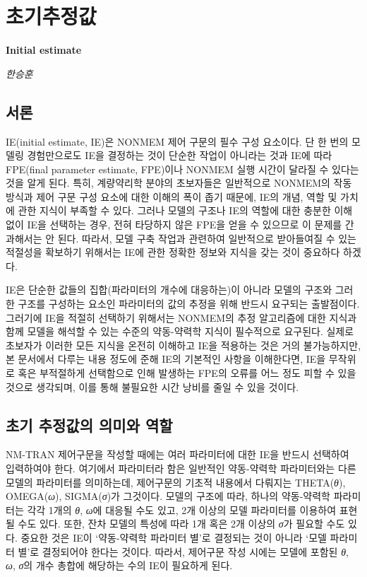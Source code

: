 \documentclass[
  10pt,
]{krantz}
\begin{document}
\hypertarget{uxcd08uxae30uxcd94uxc815uxac12}{%
\chapter{초기추정값}\label{uxcd08uxae30uxcd94uxc815uxac12}}

\textbf{Initial estimate}

\emph{한승훈}

\hypertarget{uxc11cuxb860}{%
\section{서론}\label{uxc11cuxb860}}

IE(initial estimate, IE)은 NONMEM 제어 구문의 필수 구성 요소이다. 단 한 번의 모델링 경험만으로도 IE을 결정하는 것이 단순한 작업이 아니라는 것과 IE에 따라 FPE(final parameter estimate, FPE)이나 NONMEM 실행 시간이 달라질 수 있다는 것을 알게 된다. 특히, 계량약리학 분야의 초보자들은 일반적으로 NONMEM의 작동 방식과 제어 구문 구성 요소에 대한 이해의 폭이 좁기 때문에, IE의 개념, 역할 및 가치에 관한 지식이 부족할 수 있다. 그러나 모델의 구조나 IE의 역할에 대한 충분한 이해 없이 IE을 선택하는 경우, 전혀 타당하지 않은 FPE을 얻을 수 있으므로 이 문제를 간과해서는 안 된다. 따라서, 모델 구축 작업과 관련하여 일반적으로 받아들여질 수 있는 적절성을 확보하기 위해서는 IE에 관한 정확한 정보와 지식을 갖는 것이 중요하다 하겠다.

IE은 단순한 값들의 집합(파라미터의 개수에 대응하는)이 아니라 모델의 구조와 그러한 구조를 구성하는 요소인 파라미터의 값의 추정을 위해 반드시 요구되는 출발점이다. 그러기에 IE을 적절히 선택하기 위해서는 NONMEM의 추정 알고리즘에 대한 지식과 함께 모델을 해석할 수 있는 수준의 약동-약력학 지식이 필수적으로 요구된다. 실제로 초보자가 이러한 모든 지식을 온전히 이해하고 IE을 적용하는 것은 거의 불가능하지만, 본 문서에서 다루는 내용 정도에 준해 IE의 기본적인 사항을 이해한다면, IE을 무작위로 혹은 부적절하게 선택함으로 인해 발생하는 FPE의 오류를 어느 정도 피할 수 있을 것으로 생각되며, 이를 통해 불필요한 시간 낭비를 줄일 수 있을 것이다.

\hypertarget{uxcd08uxae30-uxcd94uxc815uxac12uxc758-uxc758uxbbf8uxc640-uxc5eduxd560}{%
\section{초기 추정값의 의미와 역할}\label{uxcd08uxae30-uxcd94uxc815uxac12uxc758-uxc758uxbbf8uxc640-uxc5eduxd560}}

NM-TRAN 제어구문을 작성할 때에는 여러 파라미터에 대한 IE을 반드시 선택하여 입력하여야 한다. 여기에서 파라미터라 함은 일반적인 약동-약력학 파라미터와는 다른 모델의 파라미터를 의미하는데, 제어구문의 기초적 내용에서 다뤄지는 THETA(\emph{θ}), OMEGA(\emph{ω}), SIGMA(\emph{σ})가 그것이다. 모델의 구조에 따라, 하나의 약동-약력학 파라미터는 각각 1개의 \emph{θ}, \emph{ω}에 대응될 수도 있고, 2개 이상의 모델 파라미터를 이용하여 표현될 수도 있다. 또한, 잔차 모델의 특성에 따라 1개 혹은 2개 이상의 \emph{σ}가 필요할 수도 있다. 중요한 것은 IE이 `약동-약력학 파라미터 별'로 결정되는 것이 아니라 `모델 파라미터 별'로 결정되어야 한다는 것이다. 따라서, 제어구문 작성 시에는 모델에 포함된 \emph{θ}, \emph{ω}, \emph{σ}의 개수 총합에 해당하는 수의 IE이 필요하게 된다.
\end{document}
